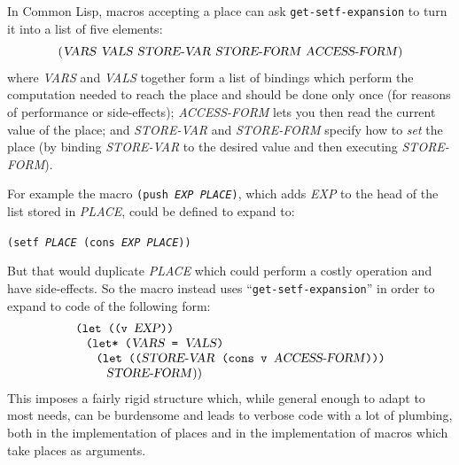 \documentclass[format=acmsmall, review]{acmart}
\makeatletter
\newcommand \MAlign [1] {\begin{array}{@{}l@{}}#1\end{array}}
\newcommand \id[1] {\textrm{\textsl{#1}}}
\makeatother
\begin{document}

In Common Lisp, macros accepting a place can ask \texttt{get-setf-expansion}
to turn it into a list of five elements:
\begin{displaymath}
  (\id{VARS}~\id{VALS}~\id{STORE-VAR}~\id{STORE-FORM}
  ~\id{ACCESS-FORM})
\end{displaymath}
where \id{VARS} and \id{VALS} together form a list of bindings which perform
the computation needed to reach the place and should be done only once
(for reasons of performance or side-effects); \id{ACCESS-FORM} lets you then
read the current value of the place; and \id{STORE-VAR} and \id{STORE-FORM}
specify how to \emph{set} the place (by binding \id{STORE-VAR} to the
desired value and then executing \id{STORE-FORM}).

For example the macro \texttt{(push \id{EXP} \id{PLACE})}, which adds
\id{EXP} to the head of the list stored in \id{PLACE}, could be defined to
expand to:
%
\begin{center}
\texttt{(setf \id{PLACE} (cons \id{EXP} \id{PLACE}))}
\end{center}
%
But that would duplicate \id{PLACE} which could perform a costly operation
and have side-effects.  So the macro instead uses
``\texttt{get-setf-expansion}'' in order to expand to code of the following
form:
\begin{displaymath}
  \MAlign{
    \texttt{(let ((v \id{EXP}))} \\
    \;\;\;\MAlign{
      \texttt{(let* (\id{VARS} = \id{VALS})} \\
      \;\;\;\MAlign{
        \texttt{(let ((\id{STORE-VAR} (cons v \id{ACCESS-FORM})))} \\
        \;\;\;\id{STORE-FORM}))}}}
\end{displaymath}
This imposes a fairly rigid structure which, while general enough to adapt
to most needs, can be burdensome and leads to verbose code with a lot
of plumbing, both in the implementation of places and in the implementation
of macros which take places as arguments.
\end{document}
